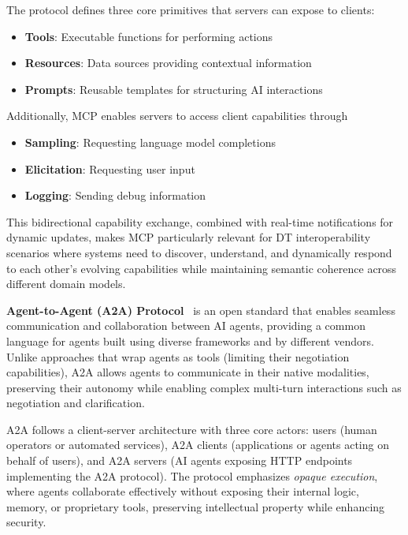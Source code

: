 The protocol defines three core primitives that servers can expose to clients:
\begin{itemize}
    \item \textbf{Tools}: Executable functions for performing actions
    \item \textbf{Resources}: Data sources providing contextual information
    \item \textbf{Prompts}: Reusable templates for structuring AI interactions
\end{itemize}
Additionally, MCP enables servers to access client capabilities through
\begin{itemize}
    \item \textbf{Sampling}: Requesting language model completions
    \item \textbf{Elicitation}: Requesting user input
    \item \textbf{Logging}: Sending debug information
\end{itemize}
This bidirectional capability exchange, combined with real-time notifications for dynamic updates,
    makes MCP particularly relevant for DT interoperability scenarios where
    systems need to discover, understand, and dynamically respond to each other's evolving capabilities
    while maintaining semantic coherence across different domain models.

\textbf{Agent-to-Agent (A2A) Protocol}~\cite{Google_A2A_2025}
    is an open standard that enables seamless communication and collaboration between AI agents, providing a
    common language for agents built using diverse frameworks and by different vendors.
Unlike approaches that wrap agents as tools (limiting their negotiation capabilities),
    A2A allows agents to communicate in their native modalities,
    preserving their autonomy while enabling complex multi-turn interactions such as negotiation and clarification.

A2A follows a client-server architecture with three core actors:
    users (human operators or automated services),
    A2A clients (applications or agents acting on behalf of users), and
    A2A servers (AI agents exposing HTTP endpoints implementing the A2A protocol).
The protocol emphasizes \emph{opaque execution}, where
    agents collaborate effectively without exposing their internal logic, memory, or proprietary tools,
    preserving intellectual property while enhancing security.

